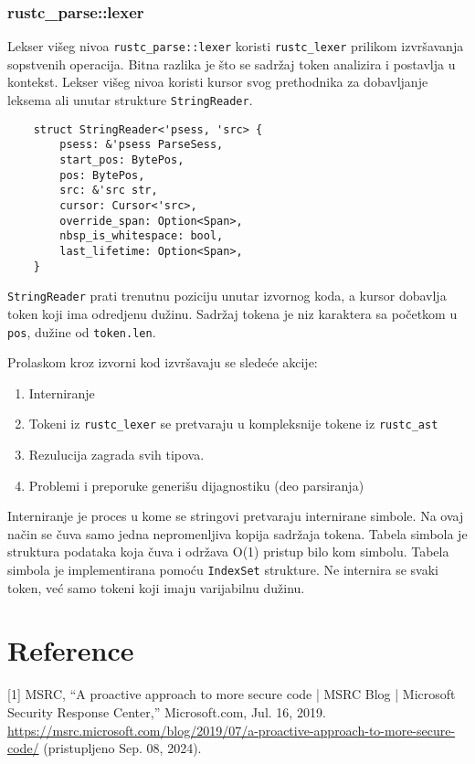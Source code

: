 \documentclass{article}
\begin{document}
\subsubsection{rustc\_parse::lexer}

Lekser višeg nivoa \verb|rustc_parse::lexer| koristi \verb|rustc_lexer| prilikom izvršavanja sopstvenih
operacija. Bitna razlika je što se sadržaj token analizira i postavlja u kontekst.
Lekser višeg nivoa koristi kursor svog prethodnika za dobavljanje leksema ali unutar strukture \verb|StringReader|. 

\begin{verbatim}
    struct StringReader<'psess, 'src> {
        psess: &'psess ParseSess,
        start_pos: BytePos,
        pos: BytePos,
        src: &'src str,
        cursor: Cursor<'src>,
        override_span: Option<Span>,
        nbsp_is_whitespace: bool,
        last_lifetime: Option<Span>,
    }
\end{verbatim}
\verb|StringReader| prati trenutnu poziciju unutar izvornog koda, a kursor 
dobavlja token koji ima odredjenu dužinu. Sadržaj tokena je niz karaktera sa početkom u \verb|pos|,
dužine od \verb|token.len|.

Prolaskom kroz izvorni kod izvršavaju se sledeće akcije:
\begin{enumerate}
    \item Interniranje 
    \item Tokeni iz \verb|rustc_lexer| se pretvaraju u kompleksnije tokene iz \verb|rustc_ast|
    \item Rezulucija zagrada svih tipova.
    \item Problemi i preporuke generišu dijagnostiku (deo parsiranja)
\end{enumerate}

Interniranje je proces u kome se stringovi pretvaraju internirane simbole. Na ovaj način
se čuva samo jedna nepromenljiva kopija sadržaja tokena. Tabela simbola je struktura podataka
koja čuva i održava O(1) pristup bilo kom simbolu.  Tabela simbola je implementirana pomoću \verb|IndexSet|
strukture. Ne internira se svaki token, već samo tokeni koji imaju varijabilnu dužinu.


\section{Reference}
[1] MSRC, “A proactive approach to more secure code | MSRC Blog | 
Microsoft Security Response Center,” Microsoft.com, Jul. 16, 2019. 
\url{https://msrc.microsoft.com/blog/2019/07/a-proactive-approach-to-more-secure-code/} 
(pristupljeno Sep. 08, 2024).
\end{document}
